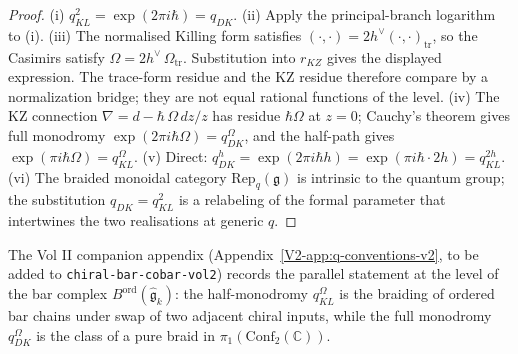 \begin{proof}
(i) $q_{KL}^2 = \exp(2\pi i \hbar) = q_{DK}$.
(ii) Apply the principal-branch logarithm to (i).
(iii) The normalised Killing form satisfies
$(\cdot,\cdot)=2h^\vee(\cdot,\cdot)_{\mathrm{tr}}$, so the Casimirs
satisfy $\Omega=2h^\vee\,\Omega_{\mathrm{tr}}$. Substitution into
$r_{KZ}$ gives the displayed expression. The trace-form residue and
the KZ residue therefore compare by a normalization bridge; they are
not equal rational functions of the level.
(iv) The KZ connection $\nabla = d - \hbar\,\Omega\,dz/z$ has residue $\hbar\Omega$ at $z=0$; Cauchy's theorem gives full monodromy $\exp(2\pi i \hbar \Omega) = q_{DK}^\Omega$, and the half-path gives $\exp(\pi i \hbar \Omega) = q_{KL}^\Omega$.
(v) Direct: $q_{DK}^{h} = \exp(2\pi i \hbar h) = \exp(\pi i \hbar \cdot 2h) = q_{KL}^{2h}$.
(vi) The braided monoidal category $\mathrm{Rep}_q(\mathfrak{g})$ is intrinsic to the quantum group; the substitution $q_{DK} = q_{KL}^2$ is a relabeling of the formal parameter that intertwines the two realisations at generic $q$.
\end{proof}

\begin{remark}
The Vol II companion appendix (Appendix~\ref*{V2-app:q-conventions-v2}, to be added to \texttt{chiral-bar-cobar-vol2}) records the parallel statement at the level of the bar complex $B^{\mathrm{ord}}(\widehat{\mathfrak{g}}_k)$: the half-monodromy $q_{KL}^\Omega$ is the braiding of ordered bar chains under swap of two adjacent chiral inputs, while the full monodromy $q_{DK}^\Omega$ is the class of a pure braid in $\pi_1(\mathrm{Conf}_2(\mathbb{C}))$.
\end{remark}
